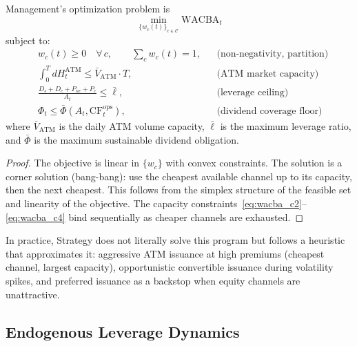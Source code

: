 \begin{proposition}\label{prop:wacba_min}
Management's optimization problem is
\begin{equation}\label{eq:wacba_opt}
  \min_{\{w_c(t)\}_{c \in \mathcal{C}}} \mathrm{WACBA}_t
\end{equation}
subject to:
\begin{align}
  & w_c(t) \ge 0 \quad \forall\, c, \qquad \sum_c w_c(t) = 1,
    & &\text{(non-negativity, partition)} \label{eq:wacba_c1} \\
  & \int_0^T dH_t^{\mathrm{ATM}} \le \bar{V}_{\mathrm{ATM}} \cdot T,
    & &\text{(ATM market capacity)} \label{eq:wacba_c2} \\
  & \frac{D_s + D_c + P_{nc} + P_c}{A_t} \le \bar{\ell},
    & &\text{(leverage ceiling)} \label{eq:wacba_c3} \\
  & \Phi_t \le \bar{\Phi}(A_t, \mathrm{CF}_t^{\mathrm{ops}}),
    & &\text{(dividend coverage floor)} \label{eq:wacba_c4}
\end{align}
where $\bar{V}_{\mathrm{ATM}}$ is the daily ATM volume capacity,
$\bar{\ell}$ is the maximum leverage ratio, and $\bar{\Phi}$ is the
maximum sustainable dividend obligation.
\end{proposition}

\begin{proof}
The objective is linear in $\{w_c\}$ with convex constraints.  The solution
is a corner solution (bang-bang): use the cheapest available channel up to
its capacity, then the next cheapest.  This follows from the simplex
structure of the feasible set and linearity of the objective.  The capacity
constraints~\eqref{eq:wacba_c2}--\eqref{eq:wacba_c4} bind sequentially as
cheaper channels are exhausted.
\end{proof}

\begin{remark}
In practice, Strategy does not literally solve this program but follows a
heuristic that approximates it: aggressive ATM issuance at high premiums
(cheapest channel, largest capacity), opportunistic convertible issuance
during volatility spikes, and preferred issuance as a backstop when
equity channels are unattractive.
\end{remark}

\subsection{Endogenous Leverage Dynamics}\label{subsec:endo_leverage}


